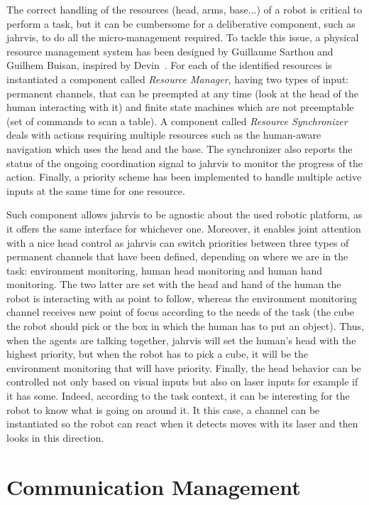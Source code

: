 \documentclass[a4paper,11pt,twoside]{StyleThese}
\begin{document}
The correct handling of the resources (head, arms, base...) of a robot is critical to perform a task, but it can be cumbersome for a deliberative component, such as \acrshort{jahrvis}, to do all the micro-management required. To tackle this issue, a physical resource management system has been designed by Guillaume Sarthou and Guilhem Buisan, inspired by Devin~\cite{devin_2017_decisional}. For each of the identified resources is instantiated a component called \emph{Resource Manager}, having two types of input: permanent channels, that can be preempted at any time (\eg look at the head of the human interacting with it) and finite state machines which are not preemptable (\eg set of commands to scan a table). A component called \emph{Resource Synchronizer} deals with actions requiring multiple resources such as the human-aware navigation which uses the head and the base. The synchronizer also reports the status of the ongoing coordination signal to \acrshort{jahrvis} to monitor the progress of the action. Finally, a priority scheme has been implemented to handle multiple active inputs at the same time for one resource. 

Such component allows \acrshort{jahrvis} to be agnostic about the used robotic platform, as it offers the same interface for whichever one. Moreover, it enables joint attention with a nice head control as \acrshort{jahrvis} can switch priorities between three types of permanent channels that have been defined, depending on where we are in the task: environment monitoring, human head monitoring and human hand monitoring. The two latter are set with the head and hand of the human the robot is interacting with as point to follow, whereas the environment monitoring channel receives new point of focus according to the needs of the task (\eg the cube the robot should pick or the box in which the human has to put an object). Thus, when the agents are talking together, \acrshort{jahrvis} will set the human's head with the highest priority, but when the robot has to pick a cube, it will be the environment monitoring that will have priority. Finally, the head behavior can be controlled not only based on visual inputs but also on laser inputs for example if it has some. Indeed, according to the task context, it can be interesting for the robot to know what is going on around it. It this case, a channel can be instantiated so the robot can react when it detects moves with its laser and then looks in this direction.

\section{Communication Management}\label{chap6:sec:comm}
\end{document}
